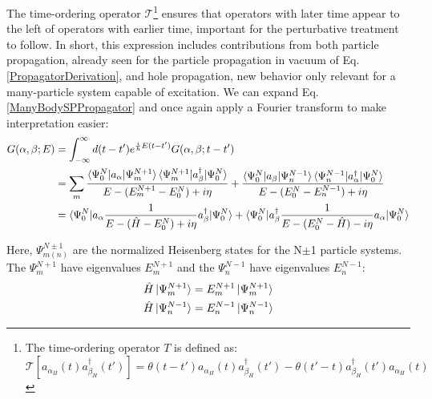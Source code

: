 \noindent
The time-ordering operator $\mathcal{T}$\footnote{
    The time-ordering operator $T$ is defined as:
    \begin{equation*}
        \mathcal{T}[a_{\alpha_{H}}(t)a^{\dagger}_{\beta_{H}}(t')]=\theta(t-t')a_{\alpha_{H}}(t)a^{\dagger}_{\beta_{H}}(t')
        -\theta(t'-t)a^{\dagger}_{\beta_{H}}(t')a_{\alpha_{H}}(t)
    \end{equation*}
} ensures that operators with later time appear to the left
of operators with earlier time, important for the perturbative treatment to follow.
In short, this expression includes contributions from both particle propagation, already seen for 
the particle
propagation in vacuum of Eq. \ref{PropagatorDerivation}, and hole propagation, new behavior only
relevant for a many-particle system capable of excitation. We can expand Eq.
\ref{ManyBodySPPropagator} and once again apply a Fourier transform to make
interpretation easier:
\begin{equation} \label{LehmannRepresentation}
    \begin{split}
        G(\alpha,\beta;E) & =
        \int_{-\infty}^{\infty}d(t-t')e^{\frac{i}{\hbar}E(t-t')}G(\alpha,\beta;t-t')\\
        & = \sum_m
        \frac{\braket{\Psi^{N}_{0}|a_{\alpha}|\Psi^{N+1}_{m}}\braket{\Psi^{N+1}_{m}|a^{\dagger}_{\beta}|\Psi^{N}_{0}}}
        {E-(E^{N+1}_{m}-E^{N}_{0})+i\eta} +
        \frac{\braket{\Psi^{N}_{0}|a_{\beta}|\Psi^{N-1}_{n}}\braket{\Psi^{N-1}_{n}|a^{\dagger}_{\alpha}|\Psi^{N}_{0}}}
        {E-(E^{N}_{0}-E^{N-1}_{n})+i\eta}\\
        & =
        \braket{\Psi^{N}_{0}|a_{\alpha}\frac{1}{E-(\hat{H}-E_{0}^{N})+i\eta}a^{\dagger}_{\beta}|\Psi^{N}_{0}} +
        \braket{\Psi^{N}_{0}|a^{\dagger}_{\beta}\frac{1}{E-(E^{N}_{0}-\hat{H})-i\eta}a_{\alpha}|\Psi^{N}_{0}}
    \end{split}
\end{equation}

\noindent
Here, $\Psi^{N\pm1}_{m(n)}$ are the normalized Heisenberg states for the N$\pm$1 particle 
systems. The $\Psi^{N+1}_{m}$ have eigenvalues $E^{N+1}_{m}$ and the $\Psi^{N-1}_{n}$ have 
eigenvalues $E^{N-1}_{n}$:
\begin{equation}
    \begin{split}
        \hat{H}\ket{\Psi^{N+1}_{m}} & = E^{N+1}_{m}\ket{\Psi^{N+1}_{m}}\\
        \hat{H}\ket{\Psi^{N-1}_{n}} & = E^{N-1}_{n}\ket{\Psi^{N-1}_{n}}
    \end{split}
\end{equation}

